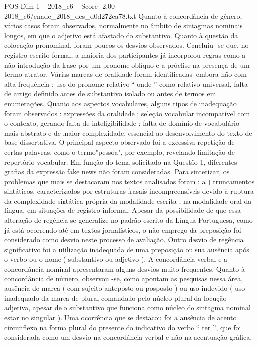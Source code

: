 \begin{textsample}{POS Dim 1 – 2018\_c6 – Score -2.00 – 2018\_c6/enade\_2018\_des\_d0d272ca78.txt}
Quanto à concordância de gênero, vários casos foram observados, normalmente no âmbito de sintagmas nominais longos, em que o adjetivo está afastado do substantivo.
Quanto à questão da colocação pronominal, foram poucos os desvios observados.
Concluiu -se que, no registro escrito formal, a maioria dos participantes já incorporou regras como a não introdução da frase por um pronome oblíquo e a próclise na presença de um termo atrator.
Várias marcas de oralidade foram identificadas, embora não com alta frequência : uso do pronome relativo “ onde ” como relativo universal, falta de artigo definido antes de substantivo isolado ou antes de termos em enumerações.
Quanto aos aspectos vocabulares, alguns tipos de inadequação foram observados : expressões da oralidade ; seleção vocabular incompatível com o contexto, gerando falta de inteligibilidade ; falta de domínio de vocabulário mais abstrato e de maior complexidade, essencial ao desenvolvimento do texto de base dissertativa.
O principal aspecto observado foi a excessiva repetição de certas palavras, como o termo"pessoa", por exemplo, revelando limitação de repertório vocabular.
Em função do tema solicitado na Questão 1, diferentes grafias da expressão fake news não foram consideradas.
Para sintetizar, os problemas que mais se destacaram nos textos analisados foram : a ) truncamentos sintáticos, caracterizados por estruturas frasais incompreensíveis devido à ruptura da complexidade sintática própria da modalidade escrita ; na modalidade oral da língua, em situações de registro informal.
Apesar da possibilidade de que essa alteração de regência se generalize no padrão escrito da Língua Portuguesa, como já está ocorrendo até em textos jornalísticos, o não emprego da preposição foi considerado como desvio neste processo de avaliação.
Outro desvio de regência significativo foi a utilização inadequada de uma preposição ou sua ausência após o verbo ou o nome ( substantivo ou adjetivo ).
A concordância verbal e a concordância nominal apresentaram alguns desvios muito frequentes.
Quanto à concordância de número, observou -se, como apontam as pesquisas nessa área, ausência de marca ( com sujeito anteposto ou posposto ) ou uso indevido ( uso inadequado da marca de plural comandado pelo núcleo plural da locução adjetiva, apesar de o substantivo que funciona como núcleo do sintagma nominal estar no singular ).
Uma ocorrência que se destacou foi a ausência de acento circunflexo na forma plural do presente do indicativo do verbo “ ter ”, que foi considerada como um desvio na concordância verbal e não na acentuação gráfica.

\end{textsample}
